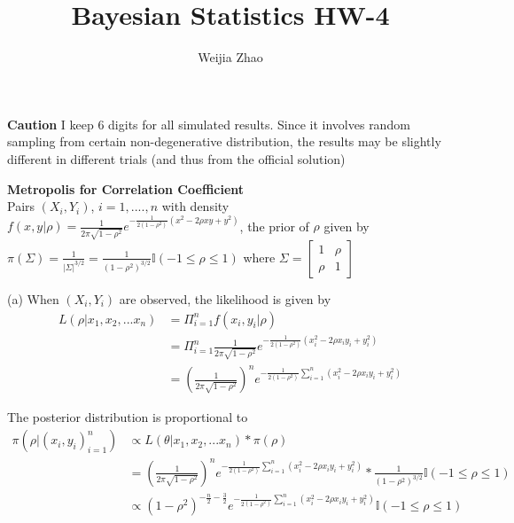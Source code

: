 \documentclass{homeworg}
\title{Bayesian Statistics HW-4}
\author{Weijia Zhao}
\begin{document}
\maketitle

\textbf{Caution} I keep 6 digits for all simulated results. Since it involves random sampling from certain non-degenerative distribution, the results may be slightly different in different trials (and thus from the official solution)

\exercise 
\textbf{Metropolis for Correlation Coefficient} \\
Pairs $(X_i,Y_i)$, $i=1,....,n$ with density $f(x,y|\rho)=\frac{1}{2\pi\sqrt{1-\rho^2}}e^{-\frac{1}{2(1-\rho^2)}(x^2-2\rho xy+y^2)}$, the prior of $\rho$ given by $\pi(\Sigma)=\frac{1}{|\Sigma|^{3/2}}=\frac{1}{(1-\rho^2)^{3/2}}\mathbb{I}(-1\leq \rho \leq 1)$ where 
$\Sigma=\begin{bmatrix}
	1 & \rho \\
	\rho & 1 
\end{bmatrix}$

(a) When $(X_i,Y_i)$ are observed, the likelihood is given by 
\begin{align*}
L(\rho|x_1,x_2,...x_n)&=\Pi_{i=1}^{n}f(x_i,y_i|\rho)\\
&=\Pi_{i=1}^{n}\frac{1}{2\pi\sqrt{1-\rho^2}}e^{-\frac{1}{2(1-\rho^2)}(x_i^2-2\rho x_iy_i+y_i^2)}\\
&=(\frac{1}{2\pi\sqrt{1-\rho^2}})^n e^{-\frac{1}{2(1-\rho^2)}\sum_{i=1}^{n}(x_i^2-2\rho x_iy_i+y_i^2)}
\end{align*}

The posterior distribution is proportional to 
\begin{align*}
\pi(\rho|(x_i,y_i)_{i=1}^n)&\propto L(\theta|x_1,x_2,...x_n)*\pi(\rho)\\
&=(\frac{1}{2\pi\sqrt{1-\rho^2}})^n e^{-\frac{1}{2(1-\rho^2)}\sum_{i=1}^{n}(x_i^2-2\rho x_iy_i+y_i^2)}*\frac{1}{(1-\rho^2)^{3/2}}\mathbb{I}(-1\leq \rho \leq 1) \\
&\propto (1-\rho^2)^{-\frac{n}{2}-\frac{3}{2}}e^{-\frac{1}{2(1-\rho^2)}\sum_{i=1}^{n}(x_i^2-2\rho x_iy_i+y_i^2)} \mathbb{I}(-1\leq \rho \leq 1)
\end{align*}
\end{document}
